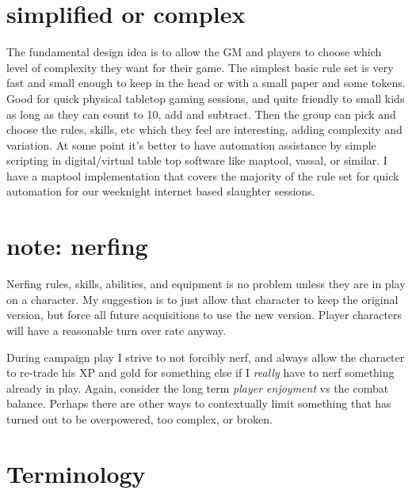 \section*{simplified or complex}
The fundamental design idea is to allow the GM and players to choose which level of complexity they want for their game. The simplest basic rule set is very fast and small enough to keep in the head or with a small paper and some tokens. Good for quick physical tabletop gaming sessions, and quite friendly to small kids as long as they can count to 10, add and subtract. Then the group can pick and choose the rules, skills, etc which they feel are interesting, adding complexity and variation. At some point it's better to have automation assistance by simple scripting in digital/virtual table top software like maptool, vassal, or similar. I have a maptool implementation that covers the majority of the rule set for quick automation for our weeknight internet based slaughter sessions.


\section*{note: nerfing}
Nerfing rules, skills, abilities, and equipment is no problem unless they are in play on a character. My suggestion is to just allow that character to keep the original version, but force all future acquisitions to use the new version. Player characters will have a reasonable turn over rate anyway.

During campaign play I strive to not forcibly nerf, and always allow the character to re-trade his XP and gold for something else if I \emph{really} have to nerf something already in play. Again, consider the long term \emph{player enjoyment} vs the combat balance. Perhaps there are other ways to contextually limit something that has turned out to be overpowered, too complex, or broken.











\section*{Terminology}


